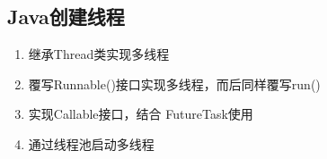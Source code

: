 \documentclass[../../../interview-questions.tex]{subfiles}
\begin{document}
\subsection{Java创建线程}

\begin{enumerate}
    \item{继承Thread类实现多线程}
    \item{覆写Runnable()接口实现多线程，而后同样覆写run()}
    \item{实现Callable接口，结合 FutureTask使用}
    \item {通过线程池启动多线程}
\end{enumerate}
\end{document}
